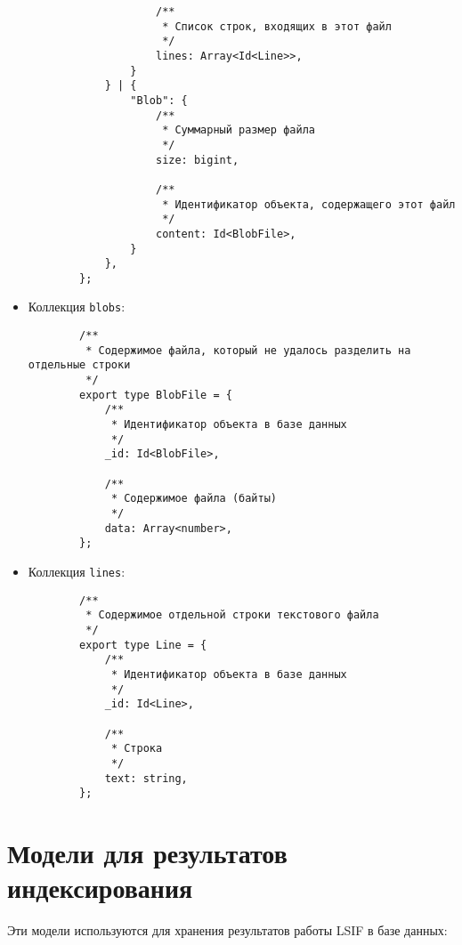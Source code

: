 \begin{itemize}
\begin{verbatim}
                    /**
                     * Список строк, входящих в этот файл
                     */
                    lines: Array<Id<Line>>,
                }
            } | {
                "Blob": {
                    /**
                     * Суммарный размер файла
                     */
                    size: bigint,
                    
                    /**
                     * Идентификатор объекта, содержащего этот файл
                     */
                    content: Id<BlobFile>,
                }
            },
        };
        \end{verbatim}
        
    \item Коллекция \texttt{blobs}:
        \begin{verbatim}
        /**
         * Содержимое файла, который не удалось разделить на отдельные строки
         */
        export type BlobFile = {
            /**
             * Идентификатор объекта в базе данных
             */
            _id: Id<BlobFile>,
            
            /**
             * Содержимое файла (байты)
             */
            data: Array<number>,
        };
        \end{verbatim}
    
    \item Коллекция \texttt{lines}:
        \begin{verbatim}
        /**
         * Содержимое отдельной строки текстового файла
         */
        export type Line = {
            /**
             * Идентификатор объекта в базе данных
             */
            _id: Id<Line>,
            
            /**
             * Строка
             */
            text: string,
        };
        \end{verbatim}
\end{itemize}

\section{Модели для результатов индексирования}

Эти модели используются для хранения результатов работы LSIF в базе данных:


